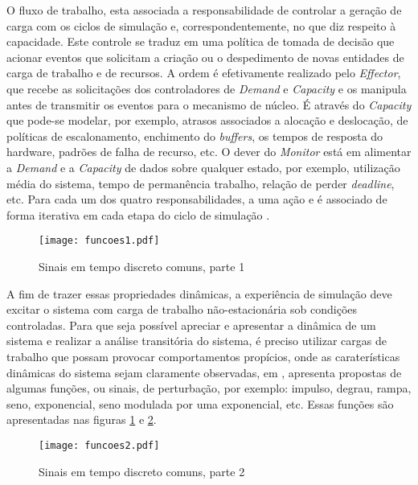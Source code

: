 O fluxo de trabalho, esta associada a responsabilidade de controlar a geração de carga com os ciclos de simulação e, correspondentemente, no que diz respeito à capacidade. Este controle se traduz em uma política de tomada de decisão que acionar eventos que solicitam a criação ou o despedimento de novas entidades de carga de trabalho e de recursos. A ordem é efetivamente realizado pelo \textit{Effector}, que recebe as solicitações dos controladores de \textit{Demand} e \textit{Capacity} e os manipula antes de transmitir os eventos para o mecanismo de núcleo. É através do \textit{Capacity} que pode-se modelar, por exemplo, atrasos associados a alocação e deslocação, de políticas de escalonamento, enchimento do \textit{buffers}, os tempos de resposta do hardware, padrões de falha de recurso, etc. O dever do \textit{Monitor} está em alimentar a \textit{Demand} e a \textit{Capacity} de dados sobre qualquer estado, por exemplo, utilização média do sistema, tempo de permanência trabalho, relação de perder \textit{deadline}, etc. Para cada um dos quatro responsabilidades, a uma ação e é associado de forma iterativa em cada etapa do ciclo de simulação \cite{Lourenco2015}. 

\begin{figure}[!htb]
	\centering
	\texttt{[image: funcoes1.pdf]}
	\caption{Sinais em tempo discreto comuns, parte 1}
	\label{fig:funcoes1}
\end{figure}

A fim de trazer essas propriedades dinâmicas, a experiência de simulação deve excitar o sistema com carga de trabalho não-estacionária sob condições controladas. Para que seja possível apreciar e apresentar a dinâmica de um sistema e realizar a análise transitória do sistema, é preciso utilizar cargas de trabalho que possam provocar comportamentos propícios, onde as caraterísticas dinâmicas do sistema sejam claramente observadas, em , apresenta propostas de algumas funções, ou sinais, de perturbação, por exemplo: impulso, degrau, rampa, seno, exponencial, seno modulada por uma exponencial, etc.  Essas funções são apresentadas nas figuras \ref{fig:funcoes1} e \ref{fig:funcoes2}.

\begin{figure}[!htb]
	\centering
	\texttt{[image: funcoes2.pdf]}
	\caption{Sinais em tempo discreto comuns, parte 2}
	\label{fig:funcoes2}
\end{figure}

